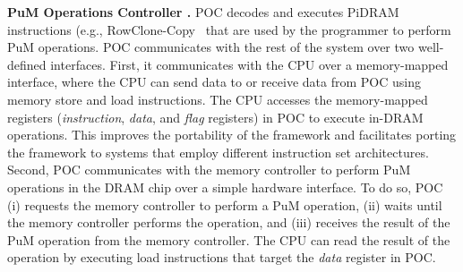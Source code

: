 \textbf{ PuM Operations Controller .} {POC decodes and executes PiDRAM instructions (e.g., RowClone-Copy~\cite{seshadri2013rowclone} that are used by the programmer to perform PuM operations. POC communicates with the rest of the system over two well{-}defined interfaces. First, it communicates with the CPU over a memory-mapped interface{, where the CPU can send data to or receive data from POC using memory store and load instructions}. The CPU accesses the memory-mapped registers (\emph{instruction}, \emph{data}, and \emph{flag} registers) in POC to execute in-DRAM operations. This improves the portability of the framework and facilitates porting the framework to systems that employ different instruction set architectures. Second, {POC} communicates with the memory controller to perform PuM operations in the DRAM chip over a simple hardware interface. {To do so,} POC (i) requests the memory controller to perform a PuM operation, (ii) waits until the memory controller performs the operation, and (iii) receives the result of the PuM operation from the memory controller. The CPU can read the result of the operation by executing load instructions that target the \emph{data} register in POC.}



